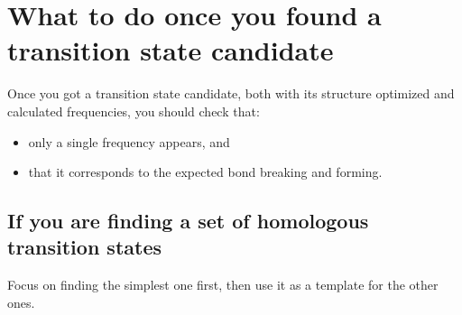 \section{What to do once you found a transition state candidate}

Once you got a transition state candidate, both with its structure optimized
and calculated frequencies, you should check that:
%
\begin{itemize}
	\item only a single frequency appears, and
	\item that it corresponds to the expected bond breaking and forming.
\end{itemize}

\subsection{If you are finding a set of homologous transition states}

Focus on finding the simplest one first, then use it as a template for the
other ones.
